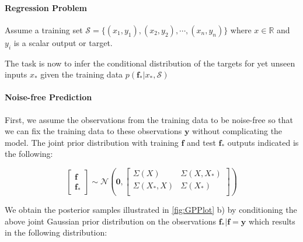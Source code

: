 \paragraph{Regression Problem}
Assume a training set $\mathcal{S} = \{(x_{1},y_{1}), (x_{2},y_{2}), \cdots, (x_{n},y_{n})\}$ where $x \in \mathbb{R}$ and $y_{i}$ is a scalar output or target. 

The task is now to infer the conditional distribution of the targets for yet unseen inputs $x_{*}$ given the training data $p(\textbf{f}_{*}\vert x_{*}, \mathcal{S})$

\paragraph{Noise-free Prediction}
First, we assume the observations from the training data to be noise-free so that we can fix the training data to these observations $\textbf{y}$ without complicating the model. The joint prior distribution with training $\textbf{f}$ and test $\textbf{f}_{*}$ outputs indicated is the following:

\begin{equation}
\begin{bmatrix}\textbf{f}\\\textbf{f}_{*}\end{bmatrix}
\sim \mathcal{N}\left(\textbf{0},
\begin{bmatrix}
    \Sigma(X) & \Sigma(X,X_{*})\\
    \Sigma(X_{*},X) & \Sigma(X_{*})\\
\end{bmatrix}
\right)
\end{equation}

We obtain the posterior samples illustrated in \ref{fig:GPPlot} b) by conditioning the above joint Gaussian prior distribution on the observations $\textbf{f}_{*}\vert\textbf{f}=\textbf{y}$ which results in the following distribution:

